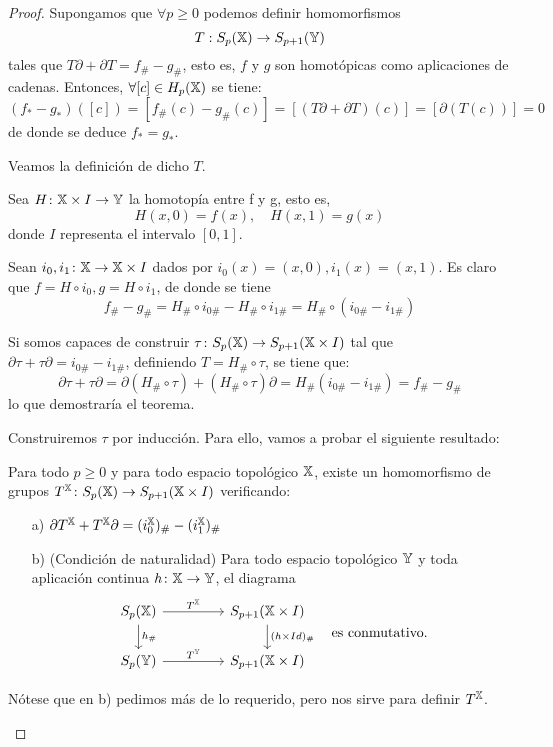 \begin{proof}
  Supongamos que $\forall p \geq 0$ podemos definir homomorfismos \[T: S_{p}({\mathbb X}) \to S_{p+1}({\mathbb Y}) \] tales que $T\partial + \partial T = f_\# - g_\#$,
  esto es, $f$ y $g$ son homotópicas como aplicaciones de cadenas. Entonces, $\forall [c] \in H_p({\mathbb X})$ se tiene:
  \[ (f_* - g_*)([c]) = [f_\#(c) - g_\#(c)] = [(T\partial + \partial T)(c)] = [\partial(T(c))] = 0\]
  de donde se deduce $f_* = g_*$.

  Veamos la definición de dicho $T$.

  Sea $H \colon {\mathbb X} \times I \to {\mathbb Y}$ la homotopía entre f y g, esto es,
  \[H(x, 0) = f(x), \quad H(x, 1) = g(x)\]
  donde $I$ representa el intervalo $[0, 1]$.

  Sean $i_0, i_1 \colon {\mathbb X} \to {\mathbb X} \times I$ dados por $i_0(x) = (x, 0), i_1(x) = (x, 1)$. Es claro que $f = H \circ i_0, g = H \circ i_1$, de donde
  se tiene \[ f_\# - g_\# = H_\# \circ i_{0\#} - H_\# \circ i_{1\#} = H_\# \circ (i_{0\#} - i_{1\#}) \]

  Si somos capaces de construir $\tau \colon S_{p}({\mathbb X}) \to S_{p+1}({\mathbb X} \times I)$ tal que $\partial \tau + \tau \partial = i_{0\#} - i_{1\#}$, definiendo
  $T = H_\# \circ \tau$, se tiene que:
  \[ \partial \tau + \tau \partial = \partial(H_\# \circ \tau) + (H_\# \circ \tau)\partial = H_\#(i_{0\#} - i_{1\#}) = f_\# - g_\#  \]
  lo que demostraría el teorema.

  Construiremos $\tau$ por inducción. Para ello, vamos a probar el siguiente resultado:
  \begin{lemma}
    Para todo $p \geq 0$ y para todo espacio topológico ${\mathbb X}$, existe un homomorfismo de grupos $T^{\mathbb X} \colon S_{p}({\mathbb X}) \to S_{p+1}({\mathbb X} \times I)$ verificando:
    \begin{itemize}
      \item[a)] $\partial T^{\mathbb X} + T^{\mathbb X} \partial = (i_0^{\mathbb X})_\# - (i_1^{\mathbb X})_\#$
      \item[b)] (Condición de naturalidad) Para todo espacio topológico ${\mathbb Y}$ y toda aplicación continua $h \colon {\mathbb X} \to {\mathbb Y}$, el diagrama
      \[
      \begin{tikzcd}
        \SX{p} \arrow{r}{T^\X} \arrow{d}{h_\#} & [2em] S_{p+1}(\X \times I) \arrow{d}{(h \times Id)_\#} \\
        \SY{p} \arrow{r}{T^\Y}                 & S_{p+1}(\X \times I)
      \end{tikzcd}
      \quad \text{es conmutativo.}
      \]
    \end{itemize}
    Nótese que en b) pedimos más de lo requerido, pero nos sirve para definir $T^{\mathbb X}$.
  \end{lemma}


\end{proof}
